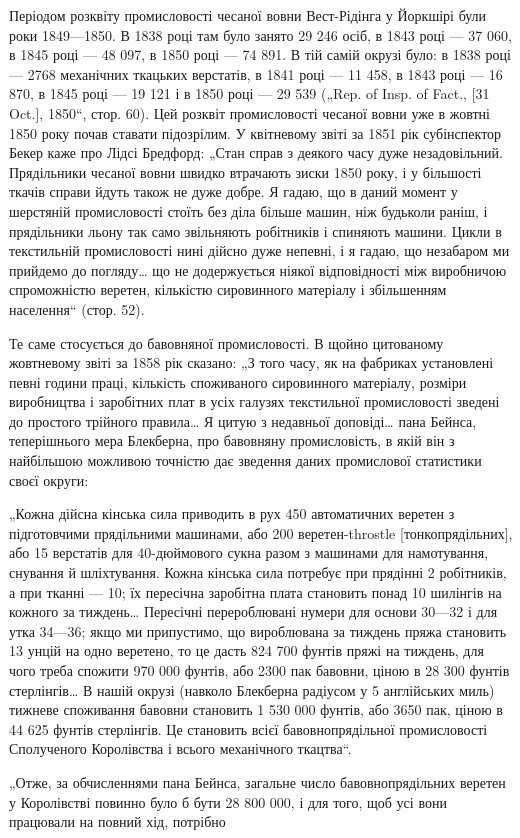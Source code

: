 
Періодом розквіту промисловості чесаної вовни Вест-Рідінга
у Йоркшірі були роки 1849—1850. В 1838 році там було занято
29 246 осіб, в 1843 році — 37 060, в 1845 році — 48 097, в 1850 році —
74 891. В тій самій окрузі було: в 1838 році — 2768 механічних
ткацьких верстатів, в 1841 році — 11 458, в 1843 році — 16 870,
в 1845 році — 19 121 і в 1850 році — 29 539 („Rep. of Insp. of Fact.,
[31 Oct.], 1850“, стор. 60). Цей розквіт промисловості чесаної
вовни уже в жовтні 1850 року почав ставати підозрілим. У квітневому
звіті за 1851 рік субінспектор Бекер каже про Лідсі Бредфорд:
„Стан справ з деякого часу дуже незадовільний. Прядільники
чесаної вовни швидко втрачають зиски 1850 року, і у більшості
ткачів справи йдуть також не дуже добре. Я гадаю, що
в даний момент у шерстяній промисловості стоїть без діла більше
машин, ніж будьколи раніш, і прядільники льону так само звільняють
робітників і спиняють машини. Цикли в текстильній промисловості
нині дійсно дуже непевні, і я гадаю, що незабаром
ми прийдемо до погляду\dots{} що не додержується ніякої відповідності
між виробничою спроможністю веретен, кількістю сировинного
матеріалу і збільшенням населення“ (стор. 52).

Те саме стосується до бавовняної промисловості. В щойно
цитованому жовтневому звіті за 1858 рік сказано: „З того часу,
як на фабриках установлені певні години праці, кількість споживаного
сировинного матеріалу, розміри виробництва і заробітних
плат в усіх галузях текстильної промисловості зведені
до простого трійного правила\dots{} Я цитую з недавньої доповіді\dots{}
пана Бейнса, теперішнього мера Блекберна, про бавовняну промисловість,
в якій він з найбільшою можливою точністю дає
зведення даних промислової статистики своєї округи:

„Кожна дійсна кінська сила приводить в рух 450 автоматичних
веретен з підготовчими прядільними машинами, або 200 веретен-throstle
[тонкопрядільних], або 15 верстатів для 40-дюймового
сукна разом з машинами для намотування, снування й
шліхтування. Кожна кінська сила потребує при прядінні 2 робітників,
а при тканні — 10; їх пересічна заробітна плата становить
понад 10  шилінгів на кожного за тиждень\dots{} Пересічні
перероблювані нумери для основи 30—32 і для утка 34—36;
якщо ми припустимо, що вироблювана за тиждень пряжа становить
13 унцій на одно веретено, то це дасть 824 700 фунтів
пряжі на тиждень, для чого треба спожити 970 000 фунтів, або
2300 пак бавовни, ціною в 28 300 фунтів стерлінгів\dots{} В нашій
окрузі (навколо Блекберна радіусом у 5 англійських миль)
тижневе споживання бавовни становить 1 530 000 фунтів, або
3650 пак, ціною в 44 625 фунтів стерлінгів. Це становить 
всієї бавовнопрядільної промисловості Сполученого Королівства
і   всього механічного ткацтва“.

„Отже, за обчисленнями пана Бейнса, загальне число бавовнопрядільних
веретен у Королівстві повинно було б бути 28 800 000,
і для того, щоб усі вони працювали на повний хід, потрібно
\parbreak{}  %
